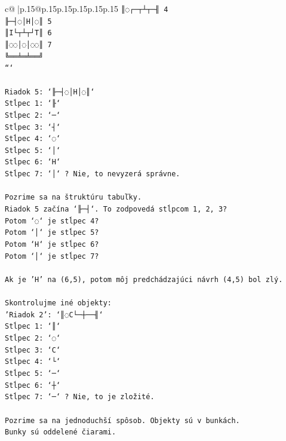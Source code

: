 \documentclass{article}
\begin{document}
{\begin{supertabular}{c@{$\;$}|p{.15\linewidth}@{}p{.15\linewidth}p{.15\linewidth}p{.15\linewidth}p{.15\linewidth}p{.15\linewidth}}
{{{\texttt{║◌┌─┬┴┬─╢ 4} \\
\texttt{╟─┤◌│H│◌║ 5} \\
\texttt{║I└┬┴┬┘T║ 6} \\
\texttt{║◌◌│◌│◌◌║ 7} \\
\texttt{╚══╧═╧══╝} \\
\texttt{```} \\
\\ 
\texttt{Riadok 5: `╟─┤◌│H│◌║`} \\
\texttt{Stĺpec 1: `╟`} \\
\texttt{Stĺpec 2: `─`} \\
\texttt{Stĺpec 3: `┤`} \\
\texttt{Stĺpec 4: `◌`} \\
\texttt{Stĺpec 5: `│`} \\
\texttt{Stĺpec 6: `H`} \\
\texttt{Stĺpec 7: `│` ? Nie, to nevyzerá správne.} \\
\\ 
\texttt{Pozrime sa na štruktúru tabuľky.} \\
\texttt{Riadok 5 začína `╟─┤`. To zodpovedá stĺpcom 1, 2, 3?} \\
\texttt{Potom `◌` je stĺpec 4?} \\
\texttt{Potom `│` je stĺpec 5?} \\
\texttt{Potom `H` je stĺpec 6?} \\
\texttt{Potom `│` je stĺpec 7?} \\
\\ 
\texttt{Ak je 'H' na (6,5), potom môj predchádzajúci návrh (4,5) bol zlý.} \\
\\ 
\texttt{Skontrolujme iné objekty:} \\
\texttt{'Riadok 2': `║◌C└─┼──╢`} \\
\texttt{Stĺpec 1: `║`} \\
\texttt{Stĺpec 2: `◌`} \\
\texttt{Stĺpec 3: `C`} \\
\texttt{Stĺpec 4: `└`} \\
\texttt{Stĺpec 5: `─`} \\
\texttt{Stĺpec 6: `┼`} \\
\texttt{Stĺpec 7: `─` ? Nie, to je zložité.} \\
\\ 
\texttt{Pozrime sa na jednoduchší spôsob. Objekty sú v bunkách.} \\
\texttt{Bunky sú oddelené čiarami.} \\
\\ 
}}}
\end{supertabular}}
\end{document}
